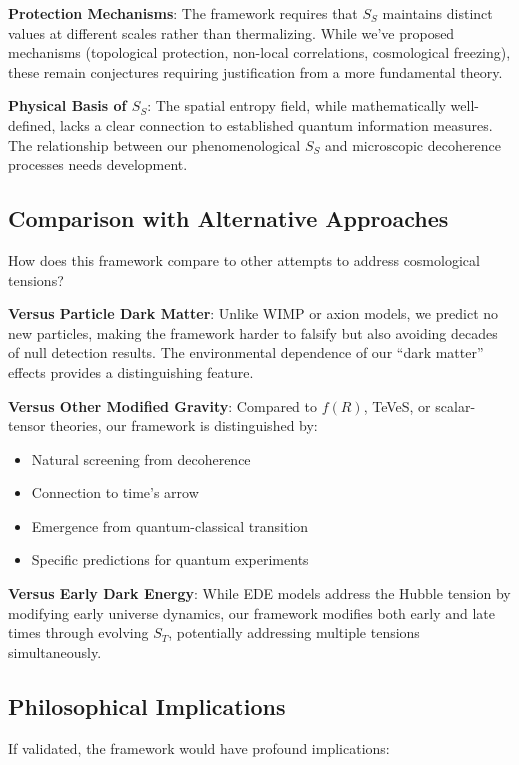 \documentclass[12pt]{article}
\begin{document}
\textbf{Protection Mechanisms}: The framework requires that $S_S$ maintains distinct values at different scales rather than thermalizing. While we've proposed mechanisms (topological protection, non-local correlations, cosmological freezing), these remain conjectures requiring justification from a more fundamental theory.

\textbf{Physical Basis of $S_S$}: The spatial entropy field, while mathematically well-defined, lacks a clear connection to established quantum information measures. The relationship between our phenomenological $S_S$ and microscopic decoherence processes needs development.

\subsection{Comparison with Alternative Approaches}

How does this framework compare to other attempts to address cosmological tensions?

\textbf{Versus Particle Dark Matter}: Unlike WIMP or axion models, we predict no new particles, making the framework harder to falsify but also avoiding decades of null detection results. The environmental dependence of our ``dark matter'' effects provides a distinguishing feature.

\textbf{Versus Other Modified Gravity}: Compared to $f(R)$, TeVeS, or scalar-tensor theories, our framework is distinguished by:
\begin{itemize}
    \item Natural screening from decoherence
    \item Connection to time's arrow
    \item Emergence from quantum-classical transition
    \item Specific predictions for quantum experiments
\end{itemize}

\textbf{Versus Early Dark Energy}: While EDE models address the Hubble tension by modifying early universe dynamics, our framework modifies both early and late times through evolving $S_T$, potentially addressing multiple tensions simultaneously.

\subsection{Philosophical Implications}

If validated, the framework would have profound implications:
\end{document}

